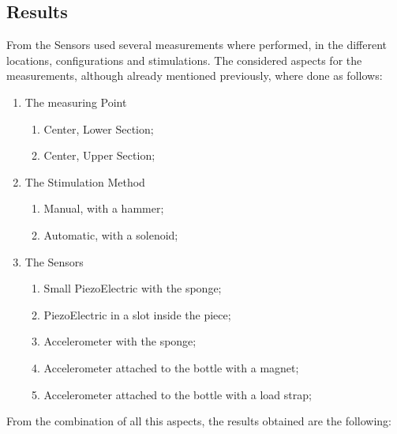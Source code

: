 \subsection{Results}
From the Sensors used several measurements where performed, in the different locations, configurations and stimulations. The considered aspects for the measurements, although already mentioned previously, where done as follows:
\begin{enumerate}
    \item The measuring Point
    \begin{enumerate}
        \item Center, Lower Section;
        \item Center, Upper Section;
    \end{enumerate}
    \item The Stimulation Method
    \begin{enumerate}
        \item Manual, with a hammer;
        \item Automatic, with a solenoid;
    \end{enumerate}
    \item The Sensors
    \begin{enumerate}
        \item Small PiezoElectric with the sponge;
        \item PiezoElectric in a slot inside the piece;
        \item Accelerometer with the sponge;
        \item Accelerometer attached to the bottle with a magnet;
        \item Accelerometer attached to the bottle with a load strap; 
    \end{enumerate}
\end{enumerate}
From the combination of all this aspects, the results obtained are the following:
